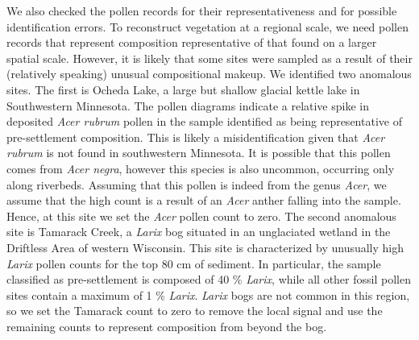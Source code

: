 \documentclass[12pt]{article}
\begin{document}
We also checked the pollen records for their representativeness and
for possible identification errors. To reconstruct vegetation at a
regional scale, we need pollen records that represent composition
representative of that found on a larger spatial scale. However, it is
likely that some sites were sampled as a result of their (relatively
speaking) unusual compositional makeup. We identified two anomalous
sites. The first is Ocheda Lake, a large but shallow glacial kettle
lake in Southwestern Minnesota. The pollen diagrams indicate a
relative spike in deposited \textit{Acer rubrum} pollen in the sample
identified as being representative of pre-settlement composition. This
is likely a misidentification given that \textit{Acer rubrum} is not
found in southwestern Minnesota. It is possible that this pollen comes
from \textit{Acer negra}, however this species is also uncommon,
occurring only along riverbeds. Assuming that this pollen is indeed
from the genus \textit{Acer}, we assume that the high count is a
result of an \textit{Acer} anther falling into the sample. Hence, at
this site we set the \textit{Acer} pollen count to zero. The second
anomalous site is Tamarack Creek, a \textit{Larix} bog situated in an
unglaciated wetland in the Driftless Area of western Wisconsin. This
site is characterized by unusually high \textit{Larix} pollen counts
for the top 80 cm of sediment. In particular, the sample classified as
pre-settlement is composed of 40 \% \textit{Larix}, while all other
fossil pollen sites contain a maximum of 1 \%
\textit{Larix}. \textit{Larix} bogs are not common in this region, so
we set the Tamarack count to zero to remove the local signal and use
the remaining counts to represent composition from beyond the bog.

\end{document}
